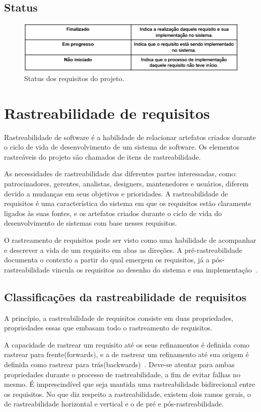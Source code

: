 \subsection{Status}
  \begin{figure}[!htbp]
    \centering
    \includegraphics[scale=0.5]{figuras/tabela_status}
    \caption[Status dos requisitos do projeto.]{Status dos requisitos do projeto. \footnotemark}
    \label{tabela_status}
  \end{figure}
\section{Rastreabilidade de requisitos}
Rastreabilidade de software é a habilidade de relacionar artefatos criados durante o ciclo de vida de desenvolvimento de um sistema de software. Os elementos rastreáveis do projeto são chamados de itens de rastreabilidade.

As necessidades de rastreabilidade das diferentes partes interessadas, como: patrocinadores, gerentes, analistas, designers, mantenedores e usuários, diferem devido a mudanças em seus objetivos e prioridades. A rastreabilidade de requisitos é uma característica do sistema em que os requisitos estão claramente ligados às suas fontes, e os artefatos criados durante o ciclo de vida do desenvolvimento de sistemas com base nesses requisitos.

O rastreamento de requisitos pode ser visto como uma habilidade de acompanhar e descrever a vida de um requisito em abas as direções. A pré-rastreabilidade documenta o contexto a partir do qual emergem os requisitos, já a pós-rastreabilidade vincula os requisitos ao desenho do sistema e sua implementação~\cite{davis}.

\subsection{Classificações da rastreabilidade de requisitos}
A princípio, a rastreabilidade de requisitos consiste em duas propriedades, propriedades essas que embasam todo o rastreamento de requisitos.

A capacidade de rastrear um requisito até os seus refinamentos é definida como rastrear para frente(forwards), e a de rastrear um refinamento até sua origem é definida como rastrear para trás(backwards)~\cite{davis}. Deve-se atentar para ambas propriedades durante o processo de rastreabilidade, a fim de evitar falhas no mesmo. É imprescindível que seja mantida uma rastreabilidade bidirecional entre os requisitos.
No que diz respeito a rastreabilidade, existem dois ramos gerais, o de rastreabilidade horizontal e vertical e o de pré e pós-rastreabilidade.

